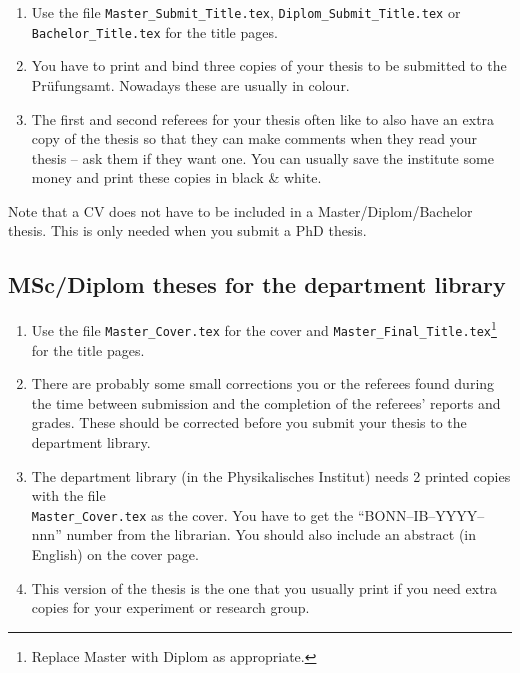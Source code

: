 \begin{enumerate}
\item Use the file \texttt{Master\_Submit\_Title.tex},
  \texttt{Diplom\_Submit\_Title.tex} or\\
  \texttt{Bachelor\_Title.tex} for the title pages.
\item You have to print and bind three copies of your thesis
  to be submitted to the
  \foreignlanguage{ngerman}{Prüfungsamt}. Nowadays these are usually in
  colour.
\item The first and second referees for your thesis often like to also
  have an extra copy of the thesis so that they can make comments when they read
  your thesis -- ask them if they want one. You can usually save the
  institute some money and print these copies in black \& white.
\end{enumerate}

Note that a CV does not have to be included in a Master/Diplom/Bachelor
thesis. This is only needed when you submit a PhD thesis.


\subsection{MSc/Diplom theses for the department library}

\begin{enumerate}
\item Use the file \texttt{Master\_Cover.tex} for the cover and
  \texttt{Master\_Final\_Title.tex}\footnote{Replace Master with Diplom
    as appropriate.} for the title pages.
\item There are probably some small corrections you or the referees
  found during the time between submission and the completion of the
  referees' reports and grades. These should be corrected before you
  submit your thesis to the department library.
\item The department
  library (in the Physikalisches
  Institut) needs 2 printed copies with the file\\
  \texttt{Master\_Cover.tex} as the cover. You have to get
  the \enquote{BONN--IB--YYYY--nnn} number from the librarian. You
  should also include an abstract (in English) on the cover page.
\item This version of the thesis is the one that you usually print if
  you need extra copies for your experiment or research group.
\end{enumerate}


